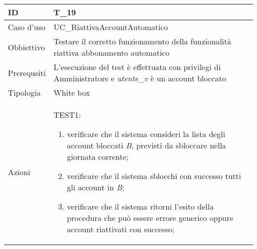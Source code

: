 \begin{table}[hb]
    \centering
    \begin{tabular}{ |p{2cm}|p{10cm}|  }
        \hline
        ID          & T\_19                                                                                                       \\\hline
        Caso d'uso  & UC\_RiattivaAccountAutomatico                                                                               \\\hline
        Obbiettivo  & Testare il corretto funzionamento della funzionalità riattiva abbonamento automatico                        \\\hline
        Prerequsiti & L'esecuzione del test è effettuata con privilegi di Amministratore e \emph{utente\_v} è un account bloccato \\\hline
        Tipologia   & White box                                                                                                   \\\hline
        Azioni      &
        TEST1:
        \begin{enumerate}[nosep, topsep=0pt]
            \item verificare che il sistema consideri la lista degli account bloccati \emph{B}, previsti da sbloccare nella giornata corrente;
            \item verificare che il sistema sblocchi con successo tutti gli account in \emph{B};
            \item verificare che il sistema ritorni l'esito della procedura che può essere errore generico oppure account riattivati con successo;
        \end{enumerate}
        \\\hline
    \end{tabular}
\end{table}

